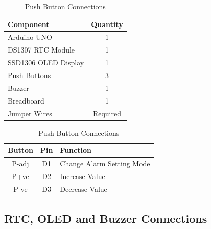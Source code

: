 \begin{table}[H]
\centering

\begin{minipage}[t]{0.48\textwidth}
\centering
\caption{Alarm Clock Components}
\label{tab:alarm_components}

\begin{tabular}{|p{4cm}|c|}
\hline
\textbf{Component} & \textbf{Quantity} \\
\hline
Arduino UNO & 1 \\
DS1307 RTC Module & 1 \\
SSD1306 OLED Display & 1 \\
Push Buttons & 3 \\
Buzzer & 1 \\
Breadboard & 1 \\
Jumper Wires & Required \\
\hline
\end{tabular}

\end{minipage}
\hfill
\begin{minipage}[t]{0.47\textwidth}
\centering
\caption{Push Button Connections}
\label{tab:alarm_buttons}

\begin{tabular}{|c|c|p{3cm}|}
\hline
\textbf{Button} & \textbf{Pin} & \textbf{Function} \\
\hline
P-adj & D1 & Change Alarm Setting Mode \\
P+ve & D2 & Increase Value \\
P-ve & D3 & Decrease Value \\
\hline
\end{tabular}

\end{minipage}

\end{table}


\subsection{RTC, OLED and Buzzer Connections}


